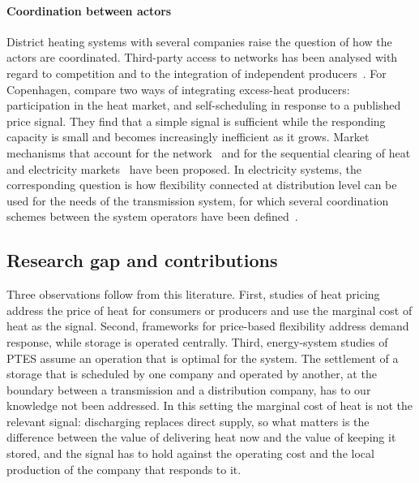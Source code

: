\paragraph{Coordination between actors}
District heating systems with several companies raise the question of how the actors are coordinated. Third-party access to networks has been analysed with regard to competition and to the integration of independent producers~\cite{soederholm2011market,buerger2019third}. For Copenhagen, \citet{frolke2022market} compare two ways of integrating excess-heat producers: participation in the heat market, and self-scheduling in response to a published price signal. They find that a simple signal is sufficient while the responding capacity is small and becomes increasingly inefficient as it grows. Market mechanisms that account for the network~\cite{frolke2022network} and for the sequential clearing of heat and electricity markets~\cite{mitridati2020heat} have been proposed. In electricity systems, the corresponding question is how flexibility connected at distribution level can be used for the needs of the transmission system, for which several coordination schemes between the system operators have been defined~\cite{gerard2018coordination}.

\subsection{Research gap and contributions}

Three observations follow from this literature. First, studies of heat pricing address the price of heat for consumers or producers and use the marginal cost of heat as the signal. Second, frameworks for price-based flexibility address demand response, while storage is operated centrally. Third, energy-system studies of PTES assume an operation that is optimal for the system. The settlement of a storage that is scheduled by one company and operated by another, at the boundary between a transmission and a distribution company, has to our knowledge not been addressed. In this setting the marginal cost of heat is not the relevant signal: discharging replaces direct supply, so what matters is the difference between the value of delivering heat now and the value of keeping it stored, and the signal has to hold against the operating cost and the local production of the company that responds to it.

